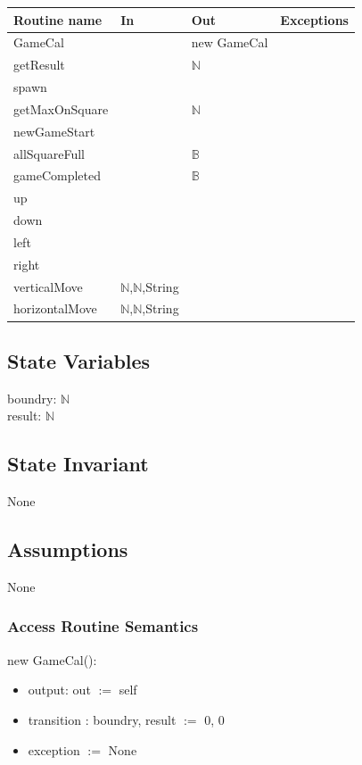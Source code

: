 \documentclass[12pt]{article}
\begin{document}
\begin{tabular}{| l | l | l | p{6cm} |}
\hline
\textbf{Routine name} & \textbf{In} & \textbf{Out} & \textbf{Exceptions}\\
\hline
GameCal & & new GameCal& \\
\hline
getResult &  & $\mathbb{N}$ & \\
\hline
spawn &  &  & \\
\hline
getMaxOnSquare &  & $\mathbb{N}$ & \\
\hline
newGameStart &  & & \\
\hline
allSquareFull &  & $\mathbb{B}$ & \\
\hline
gameCompleted &  & $\mathbb{B}$ & \\
\hline
up &  &  & \\
\hline
down &  &  & \\
\hline
left &  &  & \\
\hline
right &  &  & \\
\hline
verticalMove & $\mathbb{N}$,$\mathbb{N}$,String  &  & \\
\hline
horizontalMove & $\mathbb{N}$,$\mathbb{N}$,String &  & \\
\hline
\end{tabular}

\subsection*{State Variables}

boundry: $\mathbb{N}$ \\
result: $\mathbb{N}$ 

\subsection*{State Invariant}

None

\subsection*{Assumptions}

None

\subsubsection* {Access Routine Semantics}

new GameCal():

\begin{itemize}
  \item output: out $:=$ self
  \item transition : boundry, result $:=$ 0, 0
    \item exception $:=$ None
\end{itemize}
\end{document}
